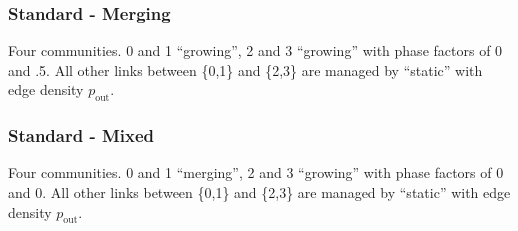 \documentclass{article}
\def\pout{p_\mathrm{out}}
\begin{document}
\subsubsection{Standard - Merging}
Four communities.  0 and 1 ``growing'', 2 and 3 ``growing'' with phase
factors of 0 and .5.  All other links between \{0,1\} and \{2,3\} are
managed by ``static'' with edge density $\pout$.

\subsubsection{Standard - Mixed}
Four communities.  0 and 1 ``merging'', 2 and 3 ``growing'' with phase
factors of 0 and 0.  All other links between \{0,1\} and \{2,3\} are
managed by ``static'' with edge density $\pout$.
\end{document}
